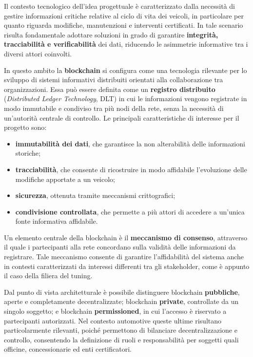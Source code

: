 Il contesto tecnologico dell'idea progettuale è caratterizzato dalla necessità di gestire informazioni critiche relative al ciclo di vita dei veicoli, in particolare per quanto riguarda modifiche, manutenzioni e interventi certificati. In tale scenario risulta fondamentale adottare soluzioni in grado di garantire \textbf{integrità, tracciabilità e verificabilità} dei dati, riducendo le asimmetrie informative tra i diversi attori coinvolti.

In questo ambito la \textbf{blockchain} si configura come una tecnologia rilevante per lo sviluppo di sistemi informativi distribuiti orientati alla collaborazione tra organizzazioni. Essa può essere definita come un \textbf{registro distribuito} (\textit{Distributed Ledger Technology}, DLT) in cui le informazioni vengono registrate in modo immutabile e condiviso tra più nodi della rete, senza la necessità di un'autorità centrale di controllo. Le principali caratteristiche di interesse per il progetto sono:

\begin{itemize}
    \item \textbf{immutabilità dei dati}, che garantisce la non alterabilità delle informazioni storiche;
    \item \textbf{tracciabilità}, che consente di ricostruire in modo affidabile l'evoluzione delle modifiche apportate a un veicolo;
    \item \textbf{sicurezza}, ottenuta tramite meccanismi crittografici;
    \item \textbf{condivisione controllata}, che permette a più attori di accedere a un'unica fonte informativa affidabile.
\end{itemize}

Un elemento centrale della blockchain è il \textbf{meccanismo di consenso}, attraverso il quale i partecipanti alla rete concordano sulla validità delle informazioni da registrare. Tale meccanismo consente di garantire l'affidabilità del sistema anche in contesti caratterizzati da interessi differenti tra gli stakeholder, come è appunto il caso della filiera del tuning.

Dal punto di vista architetturale è possibile distinguere blockchain \textbf{pubbliche}, aperte e completamente decentralizzate; blockchain \textbf{private}, controllate da un singolo soggetto; e blockchain \textbf{permissioned}, in cui l'accesso è riservato a partecipanti autorizzati. Nel contesto automotive queste ultime risultano particolarmente rilevanti, poiché permettono di bilanciare decentralizzazione e controllo, consentendo la definizione di ruoli e responsabilità per soggetti quali officine, concessionarie ed enti certificatori.

